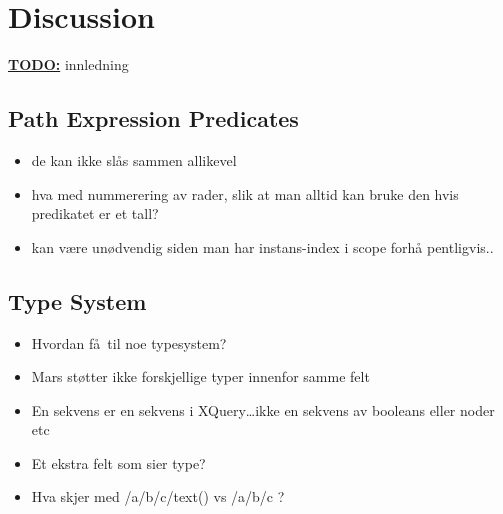 \chapter{Discussion}
\label{chapter:discussion}

\textbf{\underline{\LARGE TODO:}} innledning




\section{Path Expression Predicates}
\begin{itemize}
  \item de kan ikke sl\aa s sammen allikevel
  \item hva med nummerering av rader, slik at man alltid kan bruke den hvis
  predikatet er et tall?
  \item kan v\ae re un\o dvendig siden man har instans-index i scope forh\aa
  pentligvis..
\end{itemize}

\section{Type System}
\begin{itemize}
  \item Hvordan f\aa~til noe typesystem?
  \item Mars st\o tter ikke forskjellige typer innenfor samme felt
  \item En sekvens er en sekvens i XQuery\ldots ikke en sekvens av booleans
  eller noder etc
  \item Et ekstra felt som sier type?
  \item Hva skjer med /a/b/c/text() vs /a/b/c ?
\end{itemize}